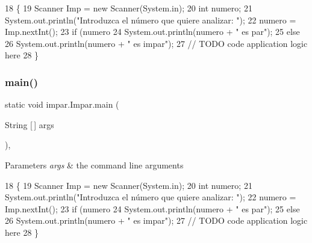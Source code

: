 \begin{DoxyCode}
18                                            \{
19         Scanner Imp = \textcolor{keyword}{new} Scanner(System.in);
20         \textcolor{keywordtype}{int} numero;
21         System.out.println(\textcolor{stringliteral}{"Introduzca el número que quiere analizar: "});
22         numero = Imp.nextInt();
23         \textcolor{keywordflow}{if} (numero%
24             System.out.println(numero + \textcolor{stringliteral}{" es par"});
25         \textcolor{keywordflow}{else}
26             System.out.println(numero + \textcolor{stringliteral}{" es impar"});
27         \textcolor{comment}{// TODO code application logic here}
28     \}
\end{DoxyCode}
\mbox{\label{classimpar_1_1_impar_adba5ae39ea2ae0f46838cc0a03bbab14}} 
\subsubsection{\texorpdfstring{main()}{main()}\hspace{0.1cm}{\footnotesize\ttfamily [2/2]}}
{\footnotesize\ttfamily static void impar.\+Impar.\+main (\begin{DoxyParamCaption}\item[{String \mbox{[}$\,$\mbox{]}}]{args }\end{DoxyParamCaption})\hspace{0.3cm}{\ttfamily [inline]}, {\ttfamily [static]}}


\begin{DoxyParams}{Parameters}
{\em args} & the command line arguments \\
\hline
\end{DoxyParams}

\begin{DoxyCode}
18                                            \{
19         Scanner Imp = \textcolor{keyword}{new} Scanner(System.in);
20         \textcolor{keywordtype}{int} numero;
21         System.out.println(\textcolor{stringliteral}{"Introduzca el número que quiere analizar: "});
22         numero = Imp.nextInt();
23         \textcolor{keywordflow}{if} (numero%
24             System.out.println(numero + \textcolor{stringliteral}{" es par"});
25         \textcolor{keywordflow}{else}
26             System.out.println(numero + \textcolor{stringliteral}{" es impar"});
27         \textcolor{comment}{// TODO code application logic here}
28     \}
\end{DoxyCode}
